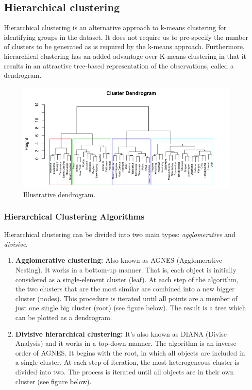 \documentclass[]{book}
\providecommand{\tightlist}{%
  \setlength{\itemsep}{0pt}\setlength{\parskip}{0pt}}
\theoremstyle{definition}
\theoremstyle{definition}
\theoremstyle{definition}
\theoremstyle{remark}
\begin{document}
\hypertarget{hierarchical-clustering}{%
\subsection{Hierarchical clustering}\label{hierarchical-clustering}}

Hierarchical clustering is an alternative approach to k-means clustering
for identifying groups in the dataset. It does not require us to
pre-specify the number of clusters to be generated as is required by the
k-means approach. Furthermore, hierarchical clustering has an added
advantage over K-means clustering in that it results in an attractive
tree-based representation of the observations, called a dendrogram.

\begin{figure}

{\centering \includegraphics[width=0.7\linewidth]{illustrations/dendrogram} 

}

\caption{Illustrative dendrogram.}\label{fig:dendrogram}
\end{figure}

\hypertarget{hierarchical-clustering-algorithms}{%
\subsubsection{Hierarchical Clustering
Algorithms}\label{hierarchical-clustering-algorithms}}

Hierarchical clustering can be divided into two main types:
\emph{agglomerative} and \emph{divisive}.

\begin{enumerate}
\def\labelenumi{\arabic{enumi}.}
\tightlist
\item
  \textbf{Agglomerative clustering:} Also known as AGNES (Agglomerative
  Nesting). It works in a bottom-up manner. That is, each object is
  initially considered as a single-element cluster (leaf). At each step
  of the algorithm, the two clusters that are the most similar are
  combined into a new bigger cluster (nodes). This procedure is iterated
  until all points are a member of just one single big cluster (root)
  (see figure below). The result is a tree which can be plotted as a
  dendrogram.
\item
  \textbf{Divisive hierarchical clustering:} It's also known as DIANA
  (Divise Analysis) and it works in a top-down manner. The algorithm is
  an inverse order of AGNES. It begins with the root, in which all
  objects are included in a single cluster. At each step of iteration,
  the most heterogeneous cluster is divided into two. The process is
  iterated until all objects are in their own cluster (see figure
  below).
\end{enumerate}
\end{document}
